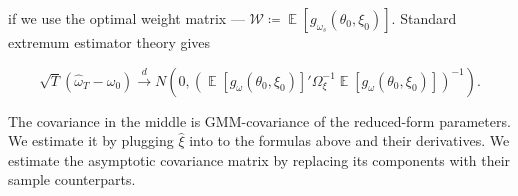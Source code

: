 \documentclass[11pt, letterpaper, twoside, final]{article}
\newcommand*{\dto}{\overset{d}{\longrightarrow}}
\newcommand*{\W}{\mathcal{W}}
\DeclareMathOperator*{\E}{\mathbb{E}}
\begin{document}
\noindent if we use the optimal weight matrix --- $\W \coloneqq \E[g_{\omega_s}(\theta_0, \xi_0)]$.
Standard extremum estimator theory gives

\begin{equation}
    \sqrt{T} \left(\widehat{\omega}_T - \omega_{0}\right)  \dto N\left(0, \left(\E[g_{\omega}(\theta_0, \xi_0)]'
    \Omega_{\xi}^{-1} \E[g_{\omega}(\theta_0, \xi_0)]\right)^{-1}\right).
\end{equation}

\noindent The covariance in the middle is GMM-covariance of the reduced-form parameters.
We estimate it by plugging $\widehat{\xi}$ into to the formulas above and their derivatives.
We estimate the asymptotic covariance matrix by replacing its components with their sample counterparts.
\end{document}

